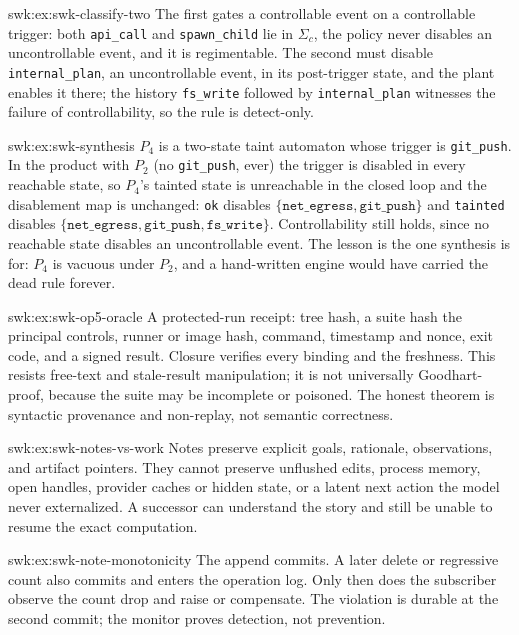 \begin{pdSolution}{swk:ex:swk-classify-two}
The first gates a controllable event on a controllable trigger: both \texttt{api\_call} and \texttt{spawn\_child} lie in $\Sigma_c$, the policy never disables an uncontrollable event, and it is regimentable. The second must disable \texttt{internal\_plan}, an uncontrollable event, in its post-trigger state, and the plant enables it there; the history \texttt{fs\_write} followed by \texttt{internal\_plan} witnesses the failure of controllability, so the rule is detect-only.
\end{pdSolution}
\begin{pdSolution}{swk:ex:swk-synthesis}
$P_4$ is a two-state taint automaton whose trigger is \texttt{git\_push}. In the product with $P_2$ (no \texttt{git\_push}, ever) the trigger is disabled in every reachable state, so $P_4$'s tainted state is unreachable in the closed loop and the disablement map is unchanged: \texttt{ok} disables $\{\texttt{net\_egress}, \texttt{git\_push}\}$ and \texttt{tainted} disables $\{\texttt{net\_egress}, \texttt{git\_push}, \texttt{fs\_write}\}$. Controllability still holds, since no reachable state disables an uncontrollable event. The lesson is the one synthesis is for: $P_4$ is vacuous under $P_2$, and a hand-written engine would have carried the dead rule forever.
\end{pdSolution}
\begin{pdSolution}{swk:ex:swk-op5-oracle}
A protected-run receipt: tree hash, a suite hash the principal controls, runner or image hash, command, timestamp and nonce, exit code, and a signed result. Closure verifies every binding and the freshness. This resists free-text and stale-result manipulation; it is not universally Goodhart-proof, because the suite may be incomplete or poisoned. The honest theorem is syntactic provenance and non-replay, not semantic correctness.
\end{pdSolution}
\begin{pdSolution}{swk:ex:swk-notes-vs-work}
Notes preserve explicit goals, rationale, observations, and artifact pointers. They cannot preserve unflushed edits, process memory, open handles, provider caches or hidden state, or a latent next action the model never externalized. A successor can understand the story and still be unable to resume the exact computation.
\end{pdSolution}
\begin{pdSolution}{swk:ex:swk-note-monotonicity}
The append commits. A later delete or regressive count also commits and enters the operation log. Only then does the subscriber observe the count drop and raise or compensate. The violation is durable at the second commit; the monitor proves detection, not prevention.
\end{pdSolution}

